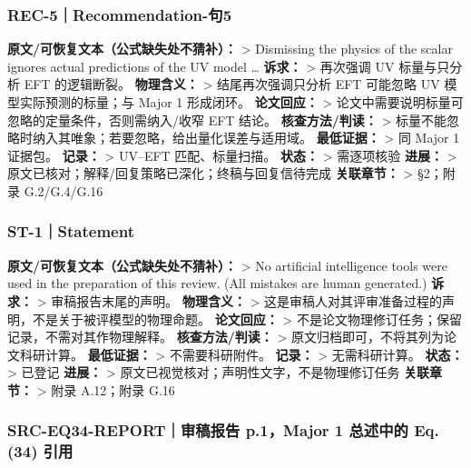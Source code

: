 \documentclass[
]{article}
\begin{document}
\subsubsection{REC-5｜Recommendation-句5}\label{rec-5recommendation-ux53e55}

\textbf{原文/可恢复文本（公式缺失处不猜补）：} \textgreater{} Dismissing
the physics of the scalar ignores actual predictions of the UV model
\ldots{} \textbf{诉求：} \textgreater{} 再次强调 UV 标量与只分析 EFT
的逻辑断裂。 \textbf{物理含义：} \textgreater{} 结尾再次强调只分析 EFT
可能忽略 UV 模型实际预测的标量；与 Major 1 形成闭环。
\textbf{论文回应：} \textgreater{}
论文中需要说明标量可忽略的定量条件，否则需纳入/收窄 EFT 结论。
\textbf{核查方法/判读：} \textgreater{}
标量不能忽略时纳入其唯象；若要忽略，给出量化误差与适用域。
\textbf{最低证据：} \textgreater{} 同 Major 1 证据包。 \textbf{记录：}
\textgreater{} UV--EFT 匹配、标量扫描。 \textbf{状态：} \textgreater{}
需逐项核验 \textbf{进展：} \textgreater{}
原文已核对；解释/回复策略已深化；终稿与回复信待完成 \textbf{关联章节：}
\textgreater{} §2；附录 G.2/G.4/G.16

\subsubsection{ST-1｜Statement}\label{st-1statement}

\textbf{原文/可恢复文本（公式缺失处不猜补）：} \textgreater{} No
artificial intelligence tools were used in the preparation of this
review. (All mistakes are human generated.) \textbf{诉求：}
\textgreater{} 审稿报告末尾的声明。 \textbf{物理含义：} \textgreater{}
这是审稿人对其评审准备过程的声明，不是关于被评模型的物理命题。
\textbf{论文回应：} \textgreater{}
不是论文物理修订任务；保留记录，不需对其作物理解释。
\textbf{核查方法/判读：} \textgreater{}
原文归档即可，不将其列为论文科研计算。 \textbf{最低证据：}
\textgreater{} 不需要科研附件。 \textbf{记录：} \textgreater{}
无需科研计算。 \textbf{状态：} \textgreater{} 已登记 \textbf{进展：}
\textgreater{} 原文已视觉核对；声明性文字，不是物理修订任务
\textbf{关联章节：} \textgreater{} 附录 A.12；附录 G.16

\subsubsection{SRC-EQ34-REPORT｜审稿报告 p.1，Major 1 总述中的 Eq. (34)
引用}\label{src-eq34-reportux5ba1ux7a3fux62a5ux544a-p.1major-1-ux603bux8ff0ux4e2dux7684-eq.-34-ux5f15ux7528}
\end{document}
